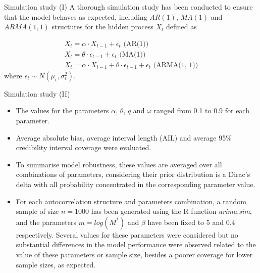\documentclass[
    10pt,
    aspectratio=169,
    usenames,
    dvipsnames
]{beamer}
\begin{document}
\begin{frame}{Simulation study (I)}
A thorough simulation study has been conducted to ensure that the model behaves as expected, including $AR(1)$, $MA(1)$ and $ARMA(1, 1)$ structures for the hidden process $X_t$ defined as

\begin{equation}\begin{array}{c}
X_t = \alpha \cdot X_{t-1} + \epsilon_t \text{ (AR(1))} \\
X_t = \theta \cdot \epsilon_{t-1} + \epsilon_t \text{ (MA(1))} \\
X_t = \alpha \cdot X_{t-1} + \theta \cdot \epsilon_{t-1} + \epsilon_t \text{ (ARMA(1, 1))}
\end{array}\end{equation}
where $\epsilon_t \sim N(\mu_{\epsilon}, \sigma_{\epsilon}^2)$.

\end{frame}
\begin{frame}{Simulation study (II)}
\begin{itemize}
\item The values for the parameters $\alpha$, $\theta$, $q$ and $\omega$ ranged from 0.1 to 0.9 for each parameter. 
\item Average absolute bias, average interval length (AIL) and average 95\% credibility interval coverage were evaluated. 
\item To summarise model robustness, these values are averaged over all combinations of parameters, considering their prior distribution is a Dirac's delta with all probability concentrated in the corresponding parameter value. 
\item For each autocorrelation structure and parameters combination, a random sample of size $n = 1000$ has been generated using the R function \textit{arima.sim}, and the parameters $m=log(M^*)$ and $\beta$ have been fixed to $5$ and $0.4$ respectively. Several values for these parameters were considered but no substantial differences in the model performance were observed related to the value of these parameters or sample size, besides a poorer coverage for lower sample sizes, as expected.
\end{itemize}
\end{frame}
\end{document}
